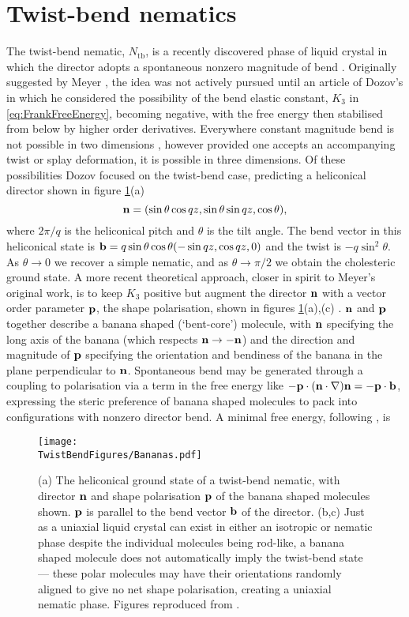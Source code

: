 \section{Twist-bend nematics} 
\label{sec:TwistBendNematics}
The twist-bend nematic, $N_{\mathrm{tb}}$, is a recently discovered phase of liquid crystal in which the director adopts a spontaneous nonzero magnitude of bend \citep{Lavrentovich2018}. Originally suggested by Meyer \citep{Meyer1976}, the idea was not actively pursued until an article of Dozov's \citep{Dozov2001} in which he considered the possibility of the bend elastic constant, $K_3$ in \eqref{eq:FrankFreeEnergy}, becoming negative, with the free energy then stabilised from below by higher order derivatives. Everywhere constant magnitude bend is not possible in two dimensions \citep{Niv2018}, however provided one accepts an accompanying twist or splay deformation, it is possible in three dimensions. Of these possibilities Dozov focused on the twist-bend case, predicting a heliconical director shown in figure \ref{fig:Bananas}(a)
\begin{equation}
\mathbf{n} = (\sin \theta \cos q z, \sin \theta \sin q z , \cos \theta),
\label{eq:TwistBendDirector}
\end{equation}
where $2\pi/q$ is the heliconical pitch and $\theta$ is the tilt angle. The bend vector in this heliconical state is $\mathbf{b} = q\sin \theta \cos\theta (-\sin q z, \cos q z, 0)$ and the twist is $- q \sin^2 \theta$. As $\theta \rightarrow 0$ we recover a simple nematic, and as $\theta \rightarrow \pi/2$ we obtain the cholesteric ground state. A more recent theoretical approach, closer in spirit to Meyer's original work, is to keep $K_3$ positive but augment the director $\mathbf{n}$ with a vector order parameter $\mathbf{p}$, the shape polarisation, shown in figures \ref{fig:Bananas}(a),(c) \citep{Shamid2013}. $\mathbf{n}$ and $\mathbf{p}$ together describe a banana shaped (`bent-core') molecule, with $\mathbf{n}$ specifying the long axis of the banana (which respects $\mathbf{n} \rightarrow -\mathbf{n}$) and the direction and magnitude of $\mathbf{p}$ specifying the orientation and bendiness of the banana in the plane perpendicular to $\mathbf{n}$. Spontaneous bend may be generated through a coupling to polarisation via a term in the free energy like $-\mathbf{p} \cdot (\mathbf{n} \cdot \nabla) \mathbf{n}=- \mathbf{p} \cdot \mathbf{b}$, expressing the steric preference of banana shaped molecules to pack into configurations with nonzero director bend. A minimal free energy, following \citep{Shamid2013}, is
\begin{figure}[htbp]
    \centering
    \texttt{[image: \\TwistBendFigures/Bananas.pdf]}
    \caption{(a) The heliconical ground state of a twist-bend nematic, with director $\mathbf{n}$ and shape polarisation $\mathbf{p}$ of the banana shaped molecules shown. $\mathbf{p}$ is parallel to the bend vector $\mathbf{b}$ of the director. (b,c) Just as a uniaxial liquid crystal can exist in either an isotropic or nematic phase despite the individual molecules being rod-like, a banana shaped molecule does not automatically imply the twist-bend state --- these polar molecules may have their orientations randomly aligned to give no net shape polarisation, creating a uniaxial nematic phase. Figures reproduced from \citep{Lavrentovich2018}.}
    \label{fig:Bananas}
\end{figure}
